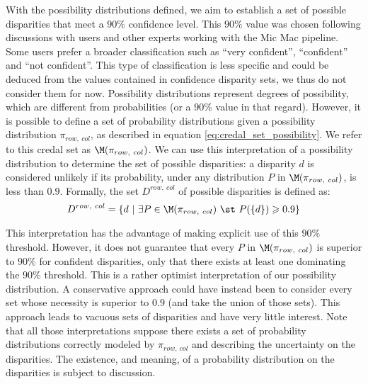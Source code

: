 
With the possibility distributions defined, we aim to establish a set of possible disparities that meet a \(90\%\) confidence level. This \( 90\%\) value was chosen following discussions with users and other experts working with the Mic Mac pipeline. Some users prefer a broader classification such as ``very confident'', ``confident'' and ``not confident''. This type of classification is less specific and could be deduced from the values contained in confidence disparity sets, we thus do not consider them for now.
Possibility distributions represent degrees of possibility, which are different from probabilities (or a \( 90\%\) value in that regard). However, it is possible to define a set of probability distributions given a possibility distribution \( \pi_{row,~col} \), as described in equation \eqref{eq:credal_set_possibility}. We refer to this credal set as \( \M(\pi_{row,~col}) \). We can use this interpretation of a possibility distribution to determine the set of possible disparities: a disparity \( d \) is considered unlikely if its probability, under any distribution \( P \) in \( \M(\pi_{row,~col}) \), is less than \(0.9\). Formally, the set \( D^{row,~col} \) of possible disparities is defined as:
\begin{equation}
    D^{row,~col}=\{ d~|~\exists P\in\M(\pi_{row,~col})~\st~P(\{d\})\geqslant 0.9 \}\label{eq:disparity_possible_set_with_proba}
\end{equation}

This interpretation has the advantage of making explicit use of this \( 90\%\) threshold. However, it does not guarantee that every \( P \) in \( \M(\pi_{row,~col}) \) is superior to \( 90\%\) for confident disparities, only that there exists at least one dominating the \( 90\%\) threshold. This is a rather optimist interpretation of our possibility distribution. A conservative approach could have instead been to consider every set whose necessity is superior to \(0.9\) (and take the union of those sets). This approach leads to vacuous sets of disparities and have very little interest. Note that all those interpretations suppose there exists a set of probability distributions correctly modeled by \( \pi_{row,~col} \) and describing the uncertainty on the disparities. The existence, and meaning, of a probability distribution on the disparities is subject to discussion. 

